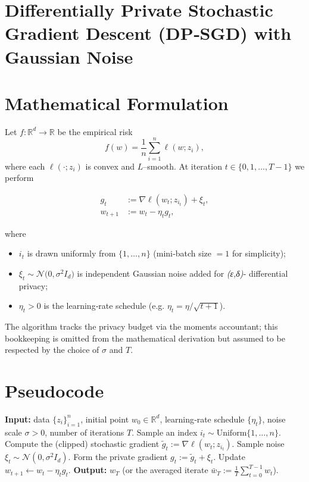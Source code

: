 \documentclass{article}
\newcommand{\R}{\mathbb{R}}
\begin{document}
\section*{Differentially Private Stochastic Gradient Descent (DP‑SGD) with Gaussian Noise}

\section*{Mathematical Formulation}
Let $f:\R^{d}\to\R$ be the empirical risk
\[
f(w)=\frac{1}{n}\sum_{i=1}^{n} \ell(w;z_i),
\]
where each $\ell(\cdot;z_i)$ is convex and $L$–smooth.  
At iteration $t\in\{0,1,\dots,T-1\}$ we perform

\[
\boxed{
\begin{aligned}
g_t &:= \nabla \ell(w_t;z_{i_t}) + \xi_t,\\
w_{t+1} &:= w_t - \eta_t g_t ,
\end{aligned}}
\tag{1}
\]

where  

\begin{itemize}
\item $i_t$ is drawn uniformly from $\{1,\dots,n\}$ (mini‑batch size $=1$ for simplicity);
\item $\xi_t\sim\mathcal{N}\!\big(0,\sigma^{2}I_{d}\big)$ is independent Gaussian noise added for \emph{(ε,δ)}‑ differential privacy;
\item $\eta_t>0$ is the learning‑rate schedule (e.g. $\eta_t=\eta/\sqrt{t+1}$).
\end{itemize}

The algorithm tracks the privacy budget via the moments accountant; this bookkeeping is omitted from the mathematical derivation but assumed to be respected by the choice of $\sigma$ and $T$.

\section*{Pseudocode}
\begin{algorithm}[H]
\caption{DP‑SGD with Gaussian Noise}
\begin{algorithmic}[1]
\State \textbf{Input:} data $\{z_i\}_{i=1}^n$, initial point $w_0\in\R^{d}$, learning‑rate schedule $\{\eta_t\}$, noise scale $\sigma>0$, number of iterations $T$.
    \State Sample an index $i_t\sim\text{Uniform}\{1,\dots,n\}$.
    \State Compute the (clipped) stochastic gradient $ \tilde g_t:=\nabla\ell(w_t;z_{i_t})$.
    \State Sample noise $\xi_t\sim\mathcal N(0,\sigma^{2}I_d)$.
    \State Form the private gradient $g_t := \tilde g_t + \xi_t$.
    \State Update $w_{t+1} \gets w_t - \eta_t g_t$.
\EndFor
\State \textbf{Output:} $w_T$ (or the averaged iterate $\bar w_T:=\frac1T\sum_{t=0}^{T-1}w_t$).
\end{algorithmic}
\end{algorithm}
\end{document}
